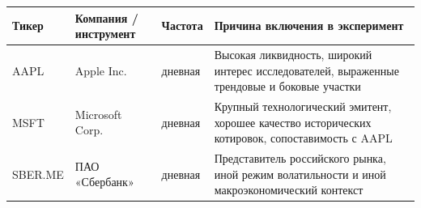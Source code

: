 \begin{center}
\small
\begin{tabularx}{\textwidth}{|p{2.8cm}|p{2.8cm}|p{2.2cm}|X|}
\hline
\textbf{Тикер} & \textbf{Компания / инструмент} & \textbf{Частота} & \textbf{Причина включения в эксперимент} \\
\hline
AAPL & Apple Inc. & дневная & Высокая ликвидность, широкий интерес исследователей, выраженные трендовые и боковые участки \\
\hline
MSFT & Microsoft Corp. & дневная & Крупный технологический эмитент, хорошее качество исторических котировок, сопоставимость с AAPL \\
\hline
SBER.ME & ПАО «Сбербанк» & дневная & Представитель российского рынка, иной режим волатильности и иной макроэкономический контекст \\
\hline
\end{tabularx}
\end{center}
